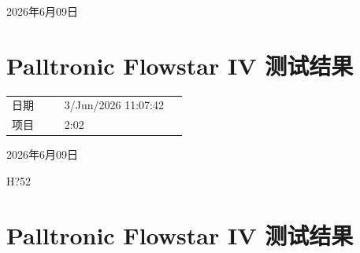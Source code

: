 \documentclass[UTF8,10pt,a4paper,fontset=fandol]{ctexart}
\newcommand{\fieldvalue}[1]{#1}
\newcommand{\handwritten}[1]{#1}
\begin{document}
\handwritten{2026年6月09日}

\vspace{12pt}

\section*{Palltronic Flowstar IV 测试结果}

\begin{tabular}{@{}p{0.27\linewidth}p{0.63\linewidth}@{}}
日期 &
\fieldvalue{3/Jun/2026 11:07:42}
\\[2pt]
项目 &
\fieldvalue{2:02}
\end{tabular}

\vspace{8pt}

\begin{center}
\end{center}

\handwritten{2026年6月09日}

\handwritten{H?52}

\newpage

\section{Palltronic Flowstar IV 测试结果}
\end{document}
